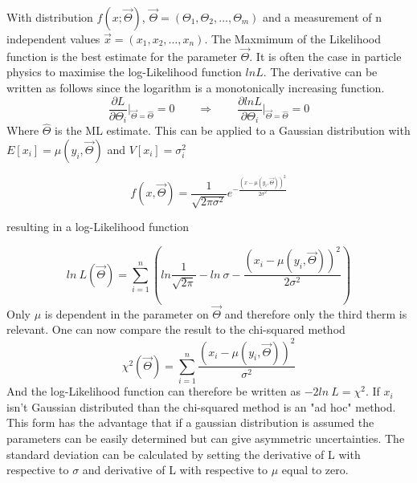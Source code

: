 \documentclass[../Bachelorarbeit.tex]{subfiles}
\begin{document}
With distribution $f(x;\overrightarrow{\Theta})$, $\overrightarrow{\Theta} = (\Theta_{1},\Theta_{2},\dots,\Theta_{m})$ and a measurement of n independent values $\overrightarrow{x}=(x_{1},x_{2},\dots,x_{n})$.
The Maxmimum of the Likelihood function is the best estimate for the parameter $\overrightarrow{\Theta}$.
It is often the case in particle physics to maximise the  log-Likelihood function $ln L$. The derivative can be written as follows since the logarithm is a monotonically increasing function.
\begin{equation}
    \frac{\partial L}{\partial \Theta_{i}} \bigg \vert_{\overrightarrow{\Theta}=\hat{\Theta}} = 0 \qquad \Longrightarrow \qquad \frac{\partial ln L}{\partial \Theta_{i}} \bigg \vert_{\overrightarrow{\Theta}=\hat{\Theta}}=0
\end{equation}
Where $\hat{\Theta}$ is the ML estimate. This can be applied to a Gaussian distribution with $E[x_{i}]=\mu(y_{i},\overrightarrow{\Theta})$ and $V[x_{i}]=\sigma_{i}^{2}$

\begin{equation}
    f(x,\overrightarrow{\Theta}) = \frac{1}{\sqrt{2\pi \sigma^{2}}} e^{-\frac{(x-\mu(y_{i},\overrightarrow{\Theta}))^{2}}{2 \sigma^{2}}}
\end{equation}

resulting in a log-Likelihood function

\begin{equation}
    ln \: L(\overrightarrow{\Theta}) = \sum^{n}_{i=1} \left( ln \frac{1}{\sqrt{2\pi}}-ln \: \sigma - \frac{(x_{i} - \mu(y_{i},\overrightarrow{\Theta}))^2}{2 \sigma^{2}}\right)
\end{equation}
Only $\mu$ is dependent in the parameter on $\overrightarrow{\Theta}$ and therefore only the third therm is relevant. One can now compare the result to the chi-squared method
\begin{equation}
    \chi^{2}(\overrightarrow{\Theta}) = \sum^{n}_{i=1} \frac{(x_{i} - \mu(y_{i},\overrightarrow{\Theta}))^2}{\sigma^{2}}
\end{equation}
And the log-Likelihood function can therefore be written as $-2 ln \: L = \chi^{2}$. If $x_{i}$ isn't Gaussian distributed than the chi-squared method is an "ad hoc" method.
This form has the advantage that if a gaussian distribution is assumed the parameters can be easily determined but can give asymmetric uncertainties.
The standard deviation can be calculated by setting the derivative of L with respective to $\sigma$ and derivative of L with respective to $\mu$ equal to zero.
\end{document}
